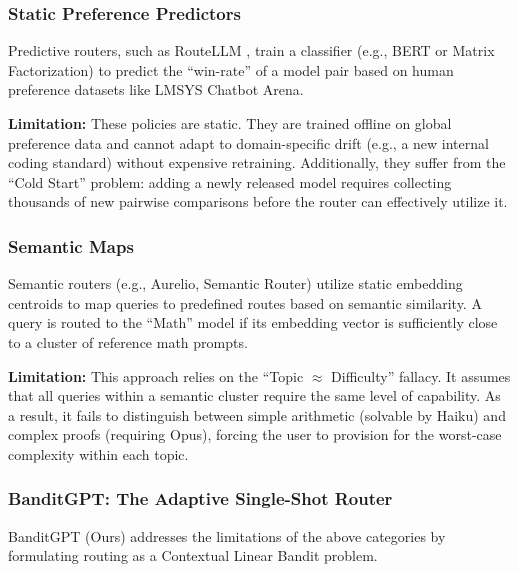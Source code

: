 \subsubsection{Static Preference Predictors}

Predictive routers, such as RouteLLM \cite{ong2024routellm}, train a classifier (e.g., BERT or Matrix Factorization) to predict the ``win-rate'' of a model pair based on human preference datasets like LMSYS Chatbot Arena.

\noindent \textbf{Limitation:} These policies are static. They are trained offline on global preference data and cannot adapt to domain-specific drift (e.g., a new internal coding standard) without expensive retraining. Additionally, they suffer from the ``Cold Start'' problem: adding a newly released model requires collecting thousands of new pairwise comparisons before the router can effectively utilize it.

\subsubsection{Semantic Maps}

Semantic routers (e.g., Aurelio, Semantic Router) utilize static embedding centroids to map queries to predefined routes based on semantic similarity. A query is routed to the ``Math'' model if its embedding vector is sufficiently close to a cluster of reference math prompts.

\noindent \textbf{Limitation:} This approach relies on the ``Topic $\approx$ Difficulty'' fallacy. It assumes that all queries within a semantic cluster require the same level of capability. As a result, it fails to distinguish between simple arithmetic (solvable by Haiku) and complex proofs (requiring Opus), forcing the user to provision for the worst-case complexity within each topic.

\subsubsection{BanditGPT: The Adaptive Single-Shot Router}

BanditGPT (Ours) addresses the limitations of the above categories by formulating routing as a Contextual Linear Bandit problem.

